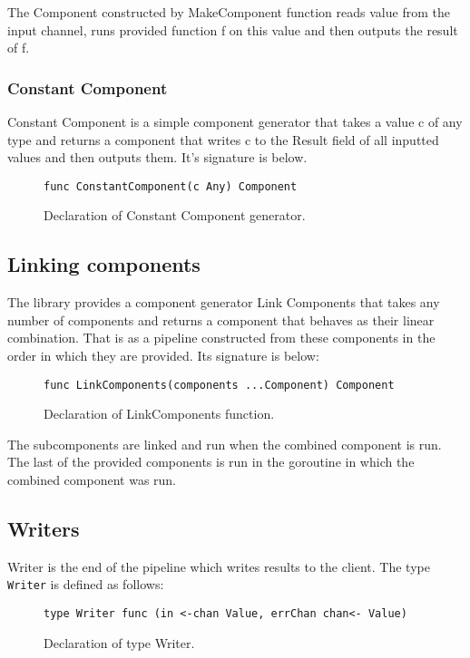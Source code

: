 \documentclass[12pt,a4paper]{article}
\begin{document}
The Component constructed by MakeComponent function reads value from the
input channel, runs provided function f on this value and then outputs the
result of f.

\subsubsection{Constant Component}
Constant Component is a simple component generator that takes a value c
of any type and returns a component that writes c to the Result field of 
all inputted values and then outputs them. It's signature is below.

\begin{figure}[h]
\centering
\begin{lstlisting}
func ConstantComponent(c Any) Component
\end{lstlisting}
\caption[scale=1.0]{Declaration of Constant Component generator.}
\label{fig:ConstantComponent}
\end{figure}


\subsection{Linking components}
The library provides a component generator Link Components that takes 
any number of components and returns a component that behaves as their 
linear combination. That is as a pipeline constructed from these components 
in the order in which they are provided. Its signature is below:

\begin{figure}[h]
\centering
\begin{lstlisting}
func LinkComponents(components ...Component) Component
\end{lstlisting}
\caption[scale=1.0]{Declaration of LinkComponents function.}
\label{fig:LinkComponents}
\end{figure}

The subcomponents are linked and run when the combined component is run. 
The last of the provided components is run in the goroutine in which
the combined component was run.

\subsection{Writers}
Writer is the end of the pipeline which writes results to the client.
The type \texttt{Writer} is defined as follows:

\begin{figure}[h]
\centering
\begin{lstlisting}
type Writer func (in <-chan Value, errChan chan<- Value)
\end{lstlisting}
\caption[scale=1.0]{Declaration of type Writer.}
\label{fig:Writer}
\end{figure}
\end{document}
